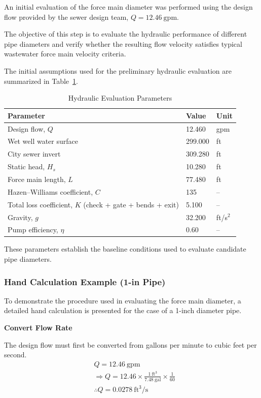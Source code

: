 An initial evaluation of the force main diameter was performed using the design flow provided by the sewer design team,
$Q = 12.46 \ \text{gpm}$.

The objective of this step is to evaluate the hydraulic performance of different pipe diameters and verify whether the resulting flow velocity satisfies typical wastewater force main velocity criteria.

The initial assumptions used for the preliminary hydraulic evaluation are summarized in Table~\ref{tab:diameter_inputs}.

\begin{table}[H]
\centering
\caption{Hydraulic Evaluation Parameters}
\label{tab:diameter_inputs}
\begin{tabular}{lll}
\toprule
\textbf{Parameter} & \textbf{Value} & \textbf{Unit} \\
\midrule
Design flow, $Q$ & 12.460 & gpm \\
Wet well water surface & 299.000 & ft \\
City sewer invert & 309.280 & ft \\
Static head, $H_s$ & 10.280 & ft \\
Force main length, $L$ & 77.480 & ft \\
Hazen--Williams coefficient, $C$ & 135 & -- \\
Total loss coefficient, $K$ (check + gate + bends + exit) & 5.100 & -- \\
Gravity, $g$ & 32.200 & ft/s$^2$ \\
Pump efficiency, $\eta$ & 0.60 & -- \\
\bottomrule
\end{tabular}
\end{table}

These parameters establish the baseline conditions used to evaluate candidate pipe diameters.

\subsubsection*{Hand Calculation Example (1-in Pipe)}

To demonstrate the procedure used in evaluating the force main diameter, a detailed hand calculation is presented for the case of a 1-inch diameter pipe.

\textbf{Convert Flow Rate}

The design flow must first be converted from gallons per minute to cubic feet per second.
\[
  \begin{aligned}
    & Q = 12.46 \ \text{gpm} \\
    &\Rightarrow Q = 12.46 \times \frac{1 \ \text{ft}^3}{7.48 \ \text{gal}} \times \frac{1}{60}\\
    &\therefore Q = 0.0278 \ \text{ft}^3/\text{s}
  \end{aligned}
\]


